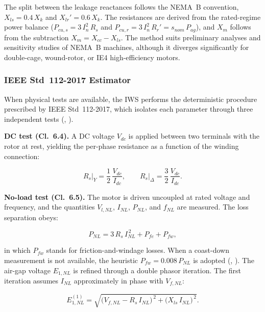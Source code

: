 \documentclass[a4paper]{ifacconf}
\begin{document}
The split between the leakage reactances follows the NEMA~B convention, $X_{ls} = 0.4\,X_k$ and $X_{lr}' = 0.6\,X_k$. The resistances are derived from the rated-regime power balance ($P_{cu,s} = 3\,I_n^2\,R_s$ and $P_{cu,r} = 3\,I_n^2\,R_r' = s_{nom}\,P_{ag}$), and $X_m$ follows from the subtraction $X_m = X_{cc} - X_{ls}$. The method suits preliminary analyses and sensitivity studies of NEMA~B machines, although it diverges significantly for double-cage, wound-rotor, or IE4 high-efficiency motors.

\subsubsection{IEEE Std~112-2017 Estimator}

When physical tests are available, the IWS performs the deterministic procedure prescribed by IEEE Std~112-2017, which isolates each parameter through three independent tests (\citeauthor{ieee112_2017}, \citeyear{ieee112_2017}).

\textbf{DC test (Cl.~6.4).} A DC voltage $V_{dc}$ is applied between two terminals with the rotor at rest, yielding the per-phase resistance as a function of the winding connection:

\begin{equation}
\label{eq:ieee_rs_en}
R_s\big|_Y = \frac{1}{2}\,\frac{V_{dc}}{I_{dc}}, \qquad R_s\big|_\Delta = \frac{3}{2}\,\frac{V_{dc}}{I_{dc}}.
\end{equation}

\textbf{No-load test (Cl.~6.5).} The motor is driven uncoupled at rated voltage and frequency, and the quantities $V_{l,NL}$, $I_{NL}$, $P_{NL}$, and $f_{NL}$ are measured. The loss separation obeys:

\begin{equation}
\label{eq:ieee_pnl_en}
P_{NL} = 3\,R_s\,I_{NL}^{\,2} + P_{fe} + P_{fw},
\end{equation}

\noindent in which $P_{fw}$ stands for friction-and-windage losses. When a coast-down measurement is not available, the heuristic $P_{fw} = 0.008\,P_{NL}$ is adopted (\citeauthor{ieee112_2017}, \citeyear{ieee112_2017}). The air-gap voltage $E_{1,NL}$ is refined through a double phasor iteration. The first iteration assumes $I_{NL}$ approximately in phase with $V_{f,NL}$:

\begin{equation}
\label{eq:ieee_e1_iter1_en}
E_{1,NL}^{(1)} = \sqrt{\bigl(V_{f,NL} - R_s\,I_{NL}\bigr)^{\,2} + \bigl(X_{ls}\,I_{NL}\bigr)^{\,2}}.
\end{equation}
\end{document}

